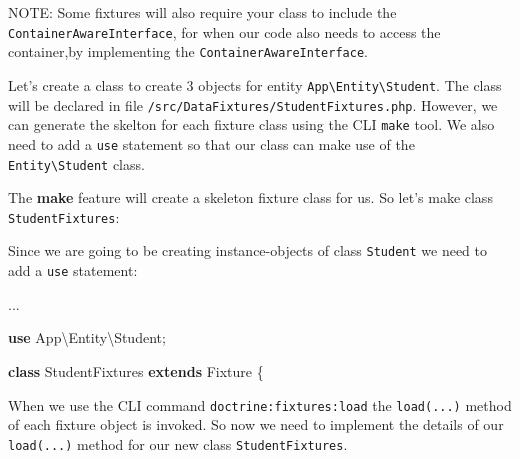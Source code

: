 \documentclass[a4paperpaper,openright]{book}
\newenvironment{Shaded}{}{}
\newcommand{\ExtensionTok}[1]{#1}
\newcommand{\KeywordTok}[1]{\textcolor[rgb]{0.00,0.44,0.13}{\textbf{#1}}}
\newcommand{\NormalTok}[1]{#1}
\newcommand{\OtherTok}[1]{\textcolor[rgb]{0.00,0.44,0.13}{#1}}
\newcommand{\StringTok}[1]{\textcolor[rgb]{0.25,0.44,0.63}{#1}}
\begin{document}
NOTE: Some fixtures will also require your class to include the
\texttt{ContainerAwareInterface}, for when our code also needs to access
the container,by implementing the \texttt{ContainerAwareInterface}.

Let's create a class to create 3 objects for entity
\texttt{App\textbackslash{}Entity\textbackslash{}Student}. The class
will be declared in file \texttt{/src/DataFixtures/StudentFixtures.php}.
However, we can generate the skelton for each fixture class using the
CLI \texttt{make} tool. We also need to add a \texttt{use} statement so
that our class can make use of the
\texttt{Entity\textbackslash{}Student} class.

The \textbf{make} feature will create a skeleton fixture class for us.
So let's make class \texttt{StudentFixtures}:

\begin{Shaded}
\end{Shaded}

Since we are going to be creating instance-objects of class
\texttt{Student} we need to add a \texttt{use} statement:

\begin{Shaded}
\begin{Highlighting}[]
    \StringTok{...}
    
    \KeywordTok{use}\NormalTok{ App\textbackslash{}Entity\textbackslash{}Student}\OtherTok{;}
    
    \KeywordTok{class}\NormalTok{ StudentFixtures }\KeywordTok{extends}\NormalTok{ Fixture}
\NormalTok{    \{}
\end{Highlighting}
\end{Shaded}

When we use the CLI command \texttt{doctrine:fixtures:load} the
\texttt{load(...)} method of each fixture object is invoked. So now we
need to implement the details of our \texttt{load(...)} method for our
new class \texttt{StudentFixtures}.
\end{document}
